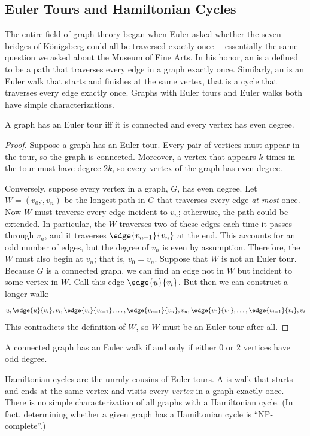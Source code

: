 \subsection{Euler Tours and Hamiltonian Cycles}
The entire field of graph theory began when Euler asked whether the seven
bridges of K\"onigsberg could all be traversed exactly once--- essentially
the same question we asked about the Museum of Fine Arts.  In his honor,
an  is a defined to be a path that traverses every edge
in a graph exactly once.  Similarly, an  is an Euler walk
that starts and finishes at the same vertex, that is a cycle that
traverses every edge exactly once.  Graphs with Euler tours and Euler
walks both have simple characterizations.
\begin{theorem}
A graph has an Euler tour iff it is connected and every vertex has even
degree.
\end{theorem}
\begin{proof}
Suppose a graph has an Euler tour.  Every pair of vertices must appear in
the tour, so the graph is connected.  Moreover, a vertex that appears $k$
times in the tour must have degree $2k$, so every vertex of the graph has
even degree.

Conversely, suppose every vertex in a graph, $G$, has even degree.  Let $W
= (v_0,\dot,v_n)$ be the longest path in $G$ that traverses every edge
\emph{at most} once.  Now $W$ must traverse every edge incident to
$v_n$; otherwise, the path could be extended.  In particular, the $W$
traverses two of these edges each time it passes through $v_n$, and it
traverses $\edge{v_{n-1}}{v_n}$ at the end.  This accounts for an odd
number of edges, but the degree of $v_n$ is even by assumption.
Therefore, the $W$ must also begin at $v_n$; that is, $v_0 = v_n$.
Suppose that $W$ is not an Euler tour.  Because $G$ is a connected
graph, we can find an edge not in $W$ but incident to some vertex in
$W$.  Call this edge $\edge{u}{v_i}$.  But then we can construct a
longer walk:
%
\[
u, \edge{u}{v_i}, v_i, \edge{v_i}{v_{i+1}}, 
\dots, 
\edge{v_{n-1}}{v_n}, v_n, \edge{v_0}{v_1}, 
\dots, 
\edge{v_{i-1}}{v_i}, v_i
\]
%
This contradicts the definition of $W$, so $W$ must be an
Euler tour after all.
\end{proof}
\begin{corollary}
A connected graph has an Euler walk if and only if either 0 or 2
vertices have odd degree.
\end{corollary}
Hamiltonian cycles are the unruly cousins of Euler tours.  A
 is walk that starts and ends at the same vertex
and visits every \emph{vertex} in a graph exactly once.  There is no
simple characterization of all graphs with a Hamiltonian cycle.  (In fact,
determining whether a given graph has a Hamiltonian cycle is
``NP-complete''.)  \fi

